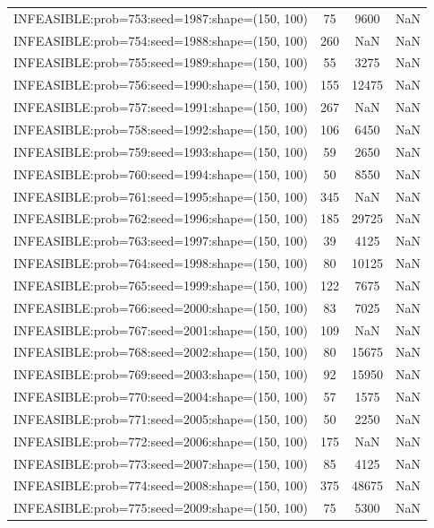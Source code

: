 \begin{longtable}{lccc}
INFEASIBLE:prob=753:seed=1987:shape=(150, 100) &    75 &  9600 &    NaN \\
INFEASIBLE:prob=754:seed=1988:shape=(150, 100) &   260 &   NaN &    NaN \\
INFEASIBLE:prob=755:seed=1989:shape=(150, 100) &    55 &  3275 &    NaN \\
INFEASIBLE:prob=756:seed=1990:shape=(150, 100) &   155 & 12475 &    NaN \\
INFEASIBLE:prob=757:seed=1991:shape=(150, 100) &   267 &   NaN &    NaN \\
INFEASIBLE:prob=758:seed=1992:shape=(150, 100) &   106 &  6450 &    NaN \\
INFEASIBLE:prob=759:seed=1993:shape=(150, 100) &    59 &  2650 &    NaN \\
INFEASIBLE:prob=760:seed=1994:shape=(150, 100) &    50 &  8550 &    NaN \\
INFEASIBLE:prob=761:seed=1995:shape=(150, 100) &   345 &   NaN &    NaN \\
INFEASIBLE:prob=762:seed=1996:shape=(150, 100) &   185 & 29725 &    NaN \\
INFEASIBLE:prob=763:seed=1997:shape=(150, 100) &    39 &  4125 &    NaN \\
INFEASIBLE:prob=764:seed=1998:shape=(150, 100) &    80 & 10125 &    NaN \\
INFEASIBLE:prob=765:seed=1999:shape=(150, 100) &   122 &  7675 &    NaN \\
INFEASIBLE:prob=766:seed=2000:shape=(150, 100) &    83 &  7025 &    NaN \\
INFEASIBLE:prob=767:seed=2001:shape=(150, 100) &   109 &   NaN &    NaN \\
INFEASIBLE:prob=768:seed=2002:shape=(150, 100) &    80 & 15675 &    NaN \\
INFEASIBLE:prob=769:seed=2003:shape=(150, 100) &    92 & 15950 &    NaN \\
INFEASIBLE:prob=770:seed=2004:shape=(150, 100) &    57 &  1575 &    NaN \\
INFEASIBLE:prob=771:seed=2005:shape=(150, 100) &    50 &  2250 &    NaN \\
INFEASIBLE:prob=772:seed=2006:shape=(150, 100) &   175 &   NaN &    NaN \\
INFEASIBLE:prob=773:seed=2007:shape=(150, 100) &    85 &  4125 &    NaN \\
INFEASIBLE:prob=774:seed=2008:shape=(150, 100) &   375 & 48675 &    NaN \\
INFEASIBLE:prob=775:seed=2009:shape=(150, 100) &    75 &  5300 &    NaN \\

\end{longtable}
